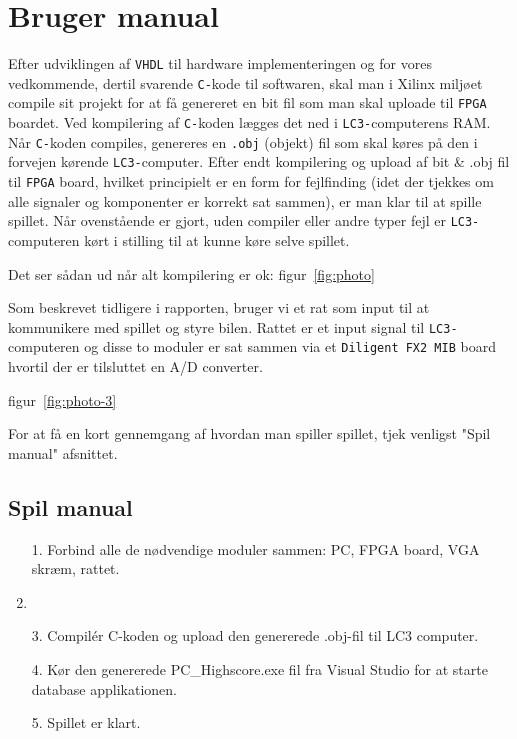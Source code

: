 \section{Bruger manual}
Efter udviklingen af \texttt{VHDL} til hardware implementeringen og for vores vedkommende, dertil svarende \texttt{C-}kode til softwaren, skal man i Xilinx miljøet compile sit projekt for at få genereret en bit fil som man skal uploade til \texttt{FPGA} boardet. Ved kompilering af \texttt{C-}koden lægges det ned i \texttt{LC3-}computerens RAM. Når \texttt{C-}koden compiles, genereres en \texttt{.obj} (objekt) fil som skal køres på den i forvejen kørende \texttt{LC3-}computer.
Efter endt kompilering og upload af bit & .obj fil til \texttt{FPGA} board, hvilket principielt er en form for fejlfinding (idet der tjekkes om alle signaler og komponenter er korrekt sat sammen), er man klar til at spille spillet. Når ovenstående er gjort, uden compiler eller andre typer fejl er \texttt{LC3-}computeren kørt i stilling til at kunne køre selve spillet.

Det ser sådan ud når alt kompilering er ok:
figur~\vref{fig:photo}

Som beskrevet tidligere i rapporten, bruger vi et rat som input til at kommunikere med spillet og styre bilen. Rattet er et input signal til \texttt{LC3-}computeren og disse to moduler er sat sammen via et \texttt{Diligent FX2 MIB} board hvortil der er tilsluttet en A/D converter. 

figur~\vref{fig:photo-3}

For at få en kort gennemgang af hvordan man spiller spillet, tjek venligst "Spil manual" afsnittet. 


\subsection{Spil manual}
\begin{enumerate}
\item[1. Forbind alle de nødvendige moduler sammen: PC, FPGA board, VGA skræm, rattet.]
\item[2. Højre klik på VHDL projektfilen(bit filen), vælg ”upload to FPGA board”.

~\vref{fig:uploadToFPGA}
\billede{!htbp}{0.5}{photo}{Billede af bit fil upload}
]
\item[3. Compilér C-koden og upload den genererede .obj-fil til LC3 computer.]
\item[4. Kør den genererede PC_Highscore.exe fil fra Visual Studio for at starte database applikationen.]
\item[5. Spillet er klart.]
\end{enumerate}

